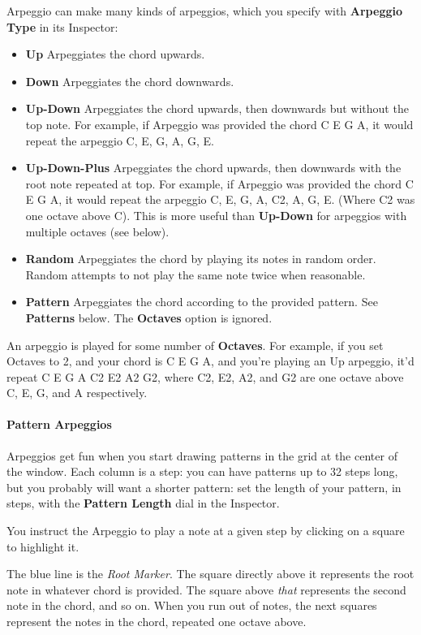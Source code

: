 \documentclass[twoside,10pt]{article}
\begin{document}
Arpeggio can make many kinds of arpeggios, which you specify with {\bf Arpeggio Type} in its Inspector:

\begin{itemize}
\item {\bf Up} Arpeggiates the chord upwards. 
\item {\bf Down} Arpeggiates the chord downwards. 
\item {\bf Up-Down} Arpeggiates the chord upwards, then downwards but without the top note.  For example, if Arpeggio was provided the chord C E G A, it would repeat the arpeggio C, E, G, A, G, E.
\item {\bf Up-Down-Plus} Arpeggiates the chord upwards, then downwards with the root note repeated at top.  For example, if Arpeggio was provided the chord C E G A, it would repeat the arpeggio C, E, G, A, C2, A, G, E.  (Where C2 was one octave above C).  This is more useful than {\bf Up-Down} for arpeggios with multiple octaves (see below).  
\item {\bf Random} Arpeggiates the chord by playing its notes in random order.  Random attempts to not play the same note twice when reasonable. 
\item {\bf Pattern} Arpeggiates the chord according to the provided pattern.  See {\bf Patterns} below.   The {\bf Octaves} option is ignored.
\end{itemize}

An arpeggio is played for some number of {\bf Octaves}.  For example, if you set Octaves to 2, and your chord is C E G A, and you're playing an Up arpeggio, it'd repeat C E G A C2 E2 A2 G2, where C2, E2, A2, and G2 are one octave above C, E, G, and A respectively.

\paragraph{Pattern Arpeggios}

Arpeggios get fun when you start drawing patterns in the grid at the center of the window.  Each column is a step: you can have patterns up to 32 steps long, but you probably will want a shorter pattern: set the length of your pattern, in steps, with the {\bf Pattern Length} dial in the Inspector.

You instruct the Arpeggio to play a note at a given step by clicking on a square to highlight it.

The blue line is the {\it Root Marker}.  The square directly above it represents the root note in whatever chord is provided.  The square above {\it that} represents the second note in the chord, and so on.  When you run out of notes, the next squares represent the notes in the chord, repeated one octave above.
\end{document}
